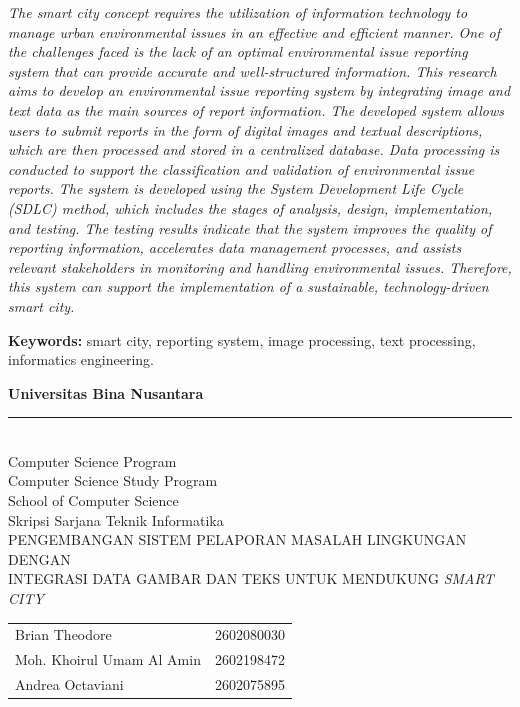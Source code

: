 {\selectfont\itshape
\noindent The smart city concept requires the utilization of information technology to manage urban environmental issues in an effective and efficient manner. One of the challenges faced is the lack of an optimal environmental issue reporting system that can provide accurate and well-structured information. This research aims to develop an environmental issue reporting system by integrating image and text data as the main sources of report information. The developed system allows users to submit reports in the form of digital images and textual descriptions, which are then processed and stored in a centralized database. Data processing is conducted to support the classification and validation of environmental issue reports. The system is developed using the System Development Life Cycle (SDLC) method, which includes the stages of analysis, design, implementation, and testing. The testing results indicate that the system improves the quality of reporting information, accelerates data management processes, and assists relevant stakeholders in monitoring and handling environmental issues. Therefore, this system can support the implementation of a sustainable, technology-driven smart city.

\noindent\textbf{Keywords:} smart city, reporting system, image processing, text processing, informatics engineering.
}

\newpage
\thispagestyle{plain}
\vspace*{-1cm}


\begin{center}
{\selectfont\bfseries
Universitas Bina Nusantara\\[0.1cm]
\rule{\textwidth}{0.8pt}\\[0.2cm]

Computer Science Program\\
Computer Science Study Program\\
School of Computer Science\\
Skripsi Sarjana Teknik Informatika\\[0.5cm]

PENGEMBANGAN SISTEM PELAPORAN MASALAH LINGKUNGAN DENGAN\\
INTEGRASI DATA GAMBAR DAN TEKS UNTUK MENDUKUNG \textit{SMART CITY}\\[0.8cm]
}

{\selectfont\bfseries
\begin{tabular}{p{7cm} l}
Brian Theodore & 2602080030 \\[0.1cm]
Moh. Khoirul Umam Al Amin & 2602198472 \\[0.1cm]
Andrea Octaviani & 2602075895
\end{tabular}
}
\end{center}

